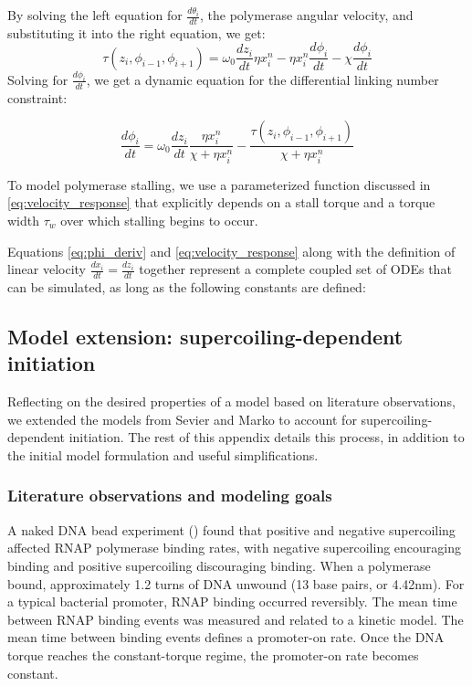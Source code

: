 \documentclass[11pt]{article}
\begin{document}
By solving the left equation for \(\frac{d \theta_i}{dt}\), the polymerase angular velocity, and substituting it into the right equation, we get:
\[\tau(z_i, \phi_{i-1}, \phi_{i+1}) = \omega_0 \frac{dz_i}{dt} \eta x_i^n - \eta x_i^n \frac{d\phi_i}{dt} - \chi \frac{d\phi_i}{dt}\]
Solving for \(\frac{d\phi_i}{dt}\), we get a dynamic equation for the differential linking number constraint:

\begin{equation}
    \frac{d\phi_i}{dt} = \omega_0 \frac{dz_i}{dt} \frac{\eta x_i^n}{\chi + \eta x_i^n} - \frac{\tau(z_i, \phi_{i-1}, \phi_{i+1})}{\chi + \eta x_i^n}
\end{equation} \label{eq:phi_deriv}

To model polymerase stalling, we use a parameterized function discussed in \cref{eq:velocity_response} that explicitly depends on a stall torque and a torque width \(\tau_w\) over which stalling begins to occur.

Equations \ref{eq:phi_deriv} and \ref{eq:velocity_response} along with the definition of linear velocity \(\frac{dx_i}{dt} = \frac{dz_i}{dt}\) together represent a complete coupled set of ODEs that can be simulated, as long as the following constants are defined:


\subsection{Model extension: supercoiling-dependent initiation} \label{sec:sc_initation}
Reflecting on the desired properties of a model based on literature observations, we extended the models from Sevier and Marko to account for supercoiling-dependent initiation. The rest of this appendix details this process, in addition to the initial model formulation and useful simplifications.

\subsubsection{Literature observations and modeling goals}
A naked DNA bead experiment (\textcite{revyakinPromoterUnwindingPromoter2004}) found that positive and negative supercoiling affected RNAP polymerase binding rates, with negative supercoiling encouraging binding and positive supercoiling discouraging binding. When a polymerase bound, approximately 1.2 turns of DNA unwound (13 base pairs, or 4.42nm). For a typical bacterial promoter, RNAP binding occurred reversibly. The mean time between RNAP binding events was measured and related to a kinetic model. The mean time between binding events defines a promoter-on rate. Once the DNA torque reaches the constant-torque regime, the promoter-on rate becomes constant.
\end{document}
